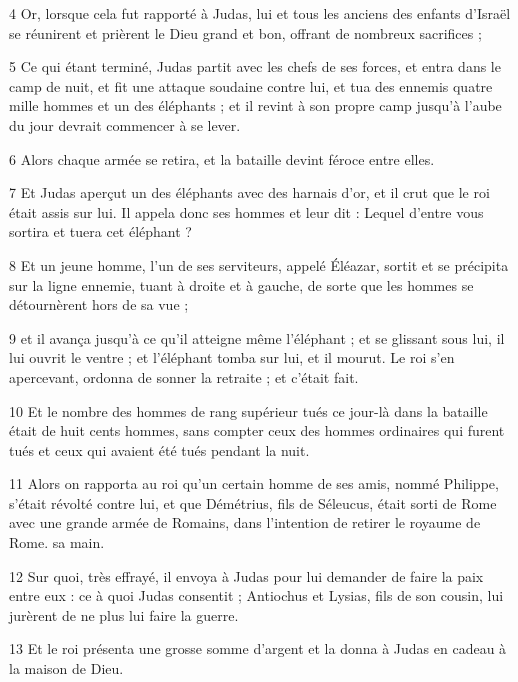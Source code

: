 \par 4 Or, lorsque cela fut rapporté à Judas, lui et tous les anciens des enfants d'Israël se réunirent et prièrent le Dieu grand et bon, offrant de nombreux sacrifices ;

\par 5 Ce qui étant terminé, Judas partit avec les chefs de ses forces, et entra dans le camp de nuit, et fit une attaque soudaine contre lui, et tua des ennemis quatre mille hommes et un des éléphants ; et il revint à son propre camp jusqu'à l'aube du jour devrait commencer à se lever.

\par 6 Alors chaque armée se retira, et la bataille devint féroce entre elles.

\par 7 Et Judas aperçut un des éléphants avec des harnais d'or, et il crut que le roi était assis sur lui. Il appela donc ses hommes et leur dit : Lequel d'entre vous sortira et tuera cet éléphant ?

\par 8 Et un jeune homme, l'un de ses serviteurs, appelé Éléazar, sortit et se précipita sur la ligne ennemie, tuant à droite et à gauche, de sorte que les hommes se détournèrent hors de sa vue ;

\par 9 et il avança jusqu'à ce qu'il atteigne même l'éléphant ; et se glissant sous lui, il lui ouvrit le ventre ; et l'éléphant tomba sur lui, et il mourut. Le roi s'en apercevant, ordonna de sonner la retraite ; et c'était fait.

\par 10 Et le nombre des hommes de rang supérieur tués ce jour-là dans la bataille était de huit cents hommes, sans compter ceux des hommes ordinaires qui furent tués et ceux qui avaient été tués pendant la nuit.

\par 11 Alors on rapporta au roi qu'un certain homme de ses amis, nommé Philippe, s'était révolté contre lui, et que Démétrius, fils de Séleucus, était sorti de Rome avec une grande armée de Romains, dans l'intention de retirer le royaume de Rome. sa main.

\par 12 Sur quoi, très effrayé, il envoya à Judas pour lui demander de faire la paix entre eux : ce à quoi Judas consentit ; Antiochus et Lysias, fils de son cousin, lui jurèrent de ne plus lui faire la guerre.

\par 13 Et le roi présenta une grosse somme d'argent et la donna à Judas en cadeau à la maison de Dieu.

